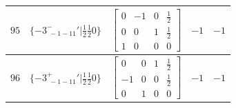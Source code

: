 \documentclass[fleqn,8pt]{jsarticle}
\begin{document}
\begin{longtable}{ccccc}
$ 95 $ & $ \{-3^{-}_{\,\,-1-11}{}'|\frac{1}{2} \frac{1}{2} 0\} $ & $ \begin{bmatrix} 0 & -1 & 0 & \frac{1}{2} \\ 0 & 0 & 1 & \frac{1}{2} \\ 1 & 0 & 0 & 0 \end{bmatrix} $ & $ -1 $ & $ -1 $ \\ \hline
$ 96 $ & $ \{-3^{+}_{\,\,-1-11}{}'|\frac{1}{2} \frac{1}{2} 0\} $ & $ \begin{bmatrix} 0 & 0 & 1 & \frac{1}{2} \\ -1 & 0 & 0 & \frac{1}{2} \\ 0 & 1 & 0 & 0 \end{bmatrix} $ & $ -1 $ & $ -1 $ \\
\end{longtable}
\end{document}
